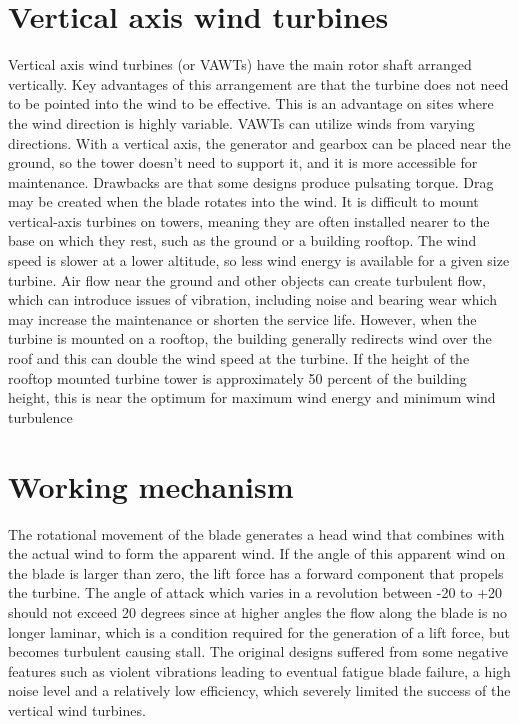 \documentclass[12pt,a4paper]{article}
\begin{document}
\section{Vertical axis wind turbines}
Vertical axis wind turbines (or VAWTs) have the main rotor shaft arranged vertically. Key advantages of this arrangement are that the turbine does not need to be pointed into the wind to be effective. This is an advantage on sites where the wind direction is highly variable. VAWTs can utilize winds from varying directions. With a vertical axis, the generator and gearbox can be placed near the ground, so the tower doesn’t need to support it, and it is more accessible for maintenance. Drawbacks are that some designs produce pulsating torque. Drag may be created when the blade rotates into the wind.
It is difficult to mount vertical-axis turbines on towers, meaning they are often installed nearer to the base on which they rest, such as the ground or a building rooftop. The wind speed is slower at a lower altitude, so less wind energy is available for a given size turbine. Air flow near the ground and other objects can create turbulent flow, which can introduce issues of vibration, including noise and bearing wear which may increase the maintenance or shorten the service life.
However, when the turbine is mounted on a rooftop, the building generally redirects wind over the roof and this can double the wind speed at the turbine. If the height of the rooftop mounted turbine tower is approximately 50 percent of the building height, this is near the optimum for maximum wind energy and minimum wind turbulence

\newpage 
\section{Working mechanism}
The rotational movement of the blade generates a head wind that combines with the actual wind to form the apparent wind. If the angle of this apparent wind on the blade is larger than zero, the lift force has a forward component that propels the turbine. 
The angle of attack which varies in a revolution between -20 to +20 should not exceed 20 degrees since at higher angles the flow along the blade is no longer laminar, which is a condition required for the generation of a lift force, but becomes turbulent causing stall. 
The original designs suffered from some negative features such as violent vibrations leading to eventual fatigue blade failure, a high noise level and a relatively low efficiency, which severely limited the success of the vertical wind turbines. 
\end{document}
